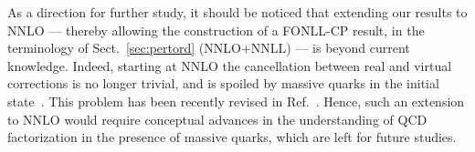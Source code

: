 As a direction for further study, it should be noticed that extending
our results to NNLO --- thereby allowing the construction of a
FONLL-CP result, in the terminology of Sect.~\ref{sec:pertord}
(NNLO+NNLL) --- is beyond current knowledge. Indeed, starting at NNLO
the cancellation between real and virtual
corrections is no longer trivial, and is spoiled by
massive quarks in the initial
state~\cite{Doria:1980ak,Catani:1985xt}. 
This problem has been recently revised in Ref.~\cite{Caola:2020xup}.
Hence, such an extension to NNLO
would require conceptual advances in the understanding of QCD
factorization in the presence of massive quarks, which are left for
future studies.

